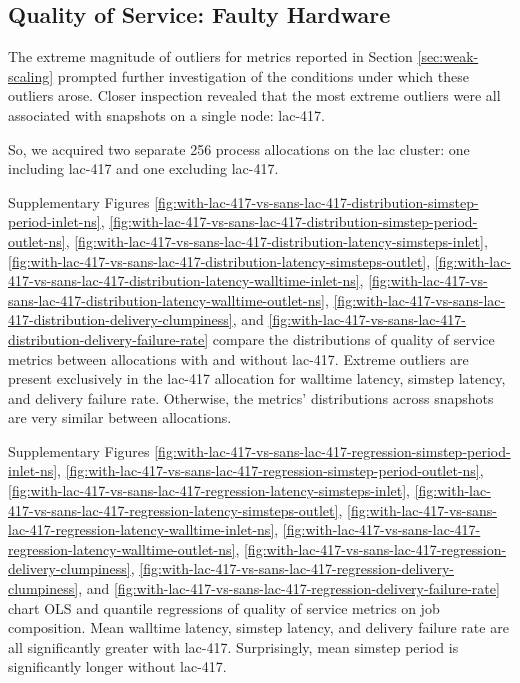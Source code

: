 \subsection{Quality of Service: Faulty Hardware}
\label{sec:with-lac-417-vs-sans-lac-417}

The extreme magnitude of outliers for metrics reported in Section \ref{sec:weak-scaling} prompted further investigation of the conditions under which these outliers arose.
Closer inspection revealed that the most extreme outliers were all associated with snapshots on a single node: lac-417.

So, we acquired two separate 256 process allocations on the lac cluster: one including lac-417 and one excluding lac-417.

Supplementary Figures \ref{fig:with-lac-417-vs-sans-lac-417-distribution-simstep-period-inlet-ns}, \ref{fig:with-lac-417-vs-sans-lac-417-distribution-simstep-period-outlet-ns}, \ref{fig:with-lac-417-vs-sans-lac-417-distribution-latency-simsteps-inlet}, \ref{fig:with-lac-417-vs-sans-lac-417-distribution-latency-simsteps-outlet}, \ref{fig:with-lac-417-vs-sans-lac-417-distribution-latency-walltime-inlet-ns}, \ref{fig:with-lac-417-vs-sans-lac-417-distribution-latency-walltime-outlet-ns}, \ref{fig:with-lac-417-vs-sans-lac-417-distribution-delivery-clumpiness}, and \ref{fig:with-lac-417-vs-sans-lac-417-distribution-delivery-failure-rate} compare the distributions of quality of service metrics between allocations with and without lac-417.
Extreme outliers are present exclusively in the lac-417 allocation for walltime latency, simstep latency, and delivery failure rate.
Otherwise, the metrics' distributions across snapshots are very similar between allocations.

Supplementary Figures \ref{fig:with-lac-417-vs-sans-lac-417-regression-simstep-period-inlet-ns}, \ref{fig:with-lac-417-vs-sans-lac-417-regression-simstep-period-outlet-ns}, \ref{fig:with-lac-417-vs-sans-lac-417-regression-latency-simsteps-inlet}, \ref{fig:with-lac-417-vs-sans-lac-417-regression-latency-simsteps-outlet}, \ref{fig:with-lac-417-vs-sans-lac-417-regression-latency-walltime-inlet-ns}, \ref{fig:with-lac-417-vs-sans-lac-417-regression-latency-walltime-outlet-ns}, \ref{fig:with-lac-417-vs-sans-lac-417-regression-delivery-clumpiness}, \ref{fig:with-lac-417-vs-sans-lac-417-regression-delivery-clumpiness}, and
\ref{fig:with-lac-417-vs-sans-lac-417-regression-delivery-failure-rate} chart OLS and quantile regressions of quality of service metrics on job composition.
Mean walltime latency, simstep latency, and delivery failure rate are all significantly greater with lac-417.
Surprisingly, mean simstep period is significantly longer without lac-417.

